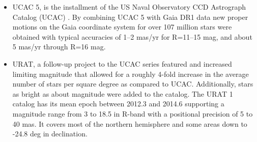 \documentclass[review]{elsarticle}
\begin{document}
\begin{itemize}
\item UCAC 5, is the  installment of the US Naval Observatory CCD Astrograph Catalog (UCAC) \citep{ucac5}. By combining UCAC 5 with Gaia DR1 data new proper motions on the Gaia coordinate system for over 107 million stars were obtained with typical accuracies of 1--2 mas/yr for R=11--15 mag, and about 5 mas/yr through R=16 mag.

\item URAT, a follow-up project to the UCAC series featured and increased limiting magnitude that allowed for a roughly 4-fold increase in the average number of stars per square degree as compared to UCAC. Additionally, stars as bright as about  magnitude were added to the catalog. The URAT 1 catalog \citep{urat1} has its mean epoch between 2012.3 and 2014.6 supporting a magnitude range from 3 to 18.5 in R-band with a positional precision of 5 to 40 mas. It covers most of the northern hemisphere and some areas down to -24.8 deg in declination.
\end{itemize}
\end{document}
